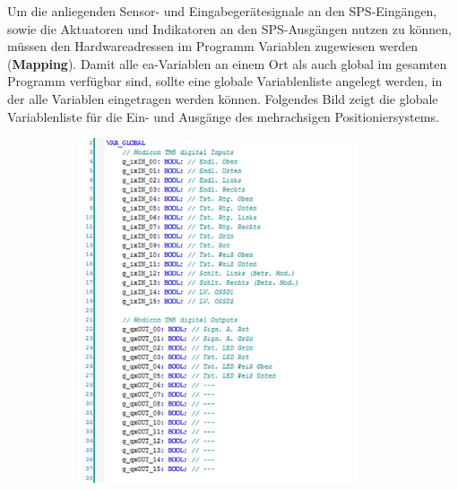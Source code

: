 \documentclass[../../../Bachelorarbeit.tex]{subfiles}
\begin{document}
Um die anliegenden Sensor- und Eingabegerätesignale an den SPS-Eingängen, sowie die Aktuatoren und Indikatoren an den SPS-Ausgängen nutzen zu können, müssen den Hardwareadressen im Programm Variablen zugewiesen werden (\eng \textbf{Mapping}). Damit alle \acs{ea}-Variablen an einem Ort als auch global im gesamten Programm verfügbar sind, sollte eine globale Variablenliste angelegt werden, in der alle Variablen eingetragen werden können. Folgendes Bild zeigt die globale Variablenliste für die Ein- und Ausgänge des mehrachsigen Positioniersystems.\\

\begin{figure}[H]
    \centering
    \begin{subfigure}[c]{0.42\textwidth}
        \centering
        \includegraphics[width=0.9\textwidth]{Images/GVL1.png}
    \end{subfigure}
    \begin{subfigure}[c]{0.42\textwidth}
        \centering

\end{subfigure}
\end{figure}
\end{document}
